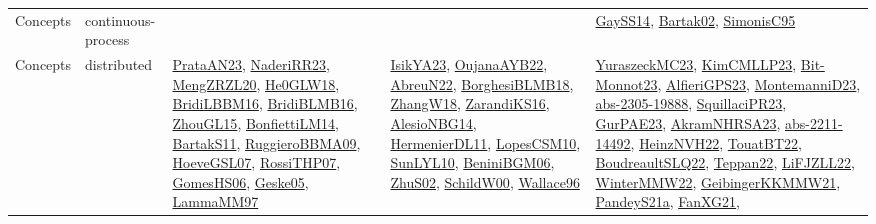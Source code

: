 {\begin{longtable}{lp{3cm}>{\raggedright}p{6cm}>{\raggedright}p{6cm}p{8cm}}
Concepts & continuous-process &  &  & \href{papers/GaySS14.pdf}{GaySS14}\cite{GaySS14}, \href{papers/Bartak02.pdf}{Bartak02}\cite{Bartak02}, \href{papers/SimonisC95.pdf}{SimonisC95}\cite{SimonisC95}\\
Concepts & distributed & \href{articles/PrataAN23.pdf}{PrataAN23}\cite{PrataAN23}, \href{articles/NaderiRR23.pdf}{NaderiRR23}\cite{NaderiRR23}, \href{articles/MengZRZL20.pdf}{MengZRZL20}\cite{MengZRZL20}, \href{papers/He0GLW18.pdf}{He0GLW18}\cite{He0GLW18}, \href{papers/BridiLBBM16.pdf}{BridiLBBM16}\cite{BridiLBBM16}, \href{articles/BridiBLMB16.pdf}{BridiBLMB16}\cite{BridiBLMB16}, \href{papers/ZhouGL15.pdf}{ZhouGL15}\cite{ZhouGL15}, \href{papers/BonfiettiLM14.pdf}{BonfiettiLM14}\cite{BonfiettiLM14}, \href{articles/BartakS11.pdf}{BartakS11}\cite{BartakS11}, \href{articles/RuggieroBBMA09.pdf}{RuggieroBBMA09}\cite{RuggieroBBMA09}, \href{papers/HoeveGSL07.pdf}{HoeveGSL07}\cite{HoeveGSL07}, \href{papers/RossiTHP07.pdf}{RossiTHP07}\cite{RossiTHP07}, \href{papers/GomesHS06.pdf}{GomesHS06}\cite{GomesHS06}, \href{papers/Geske05.pdf}{Geske05}\cite{Geske05}, \href{articles/LammaMM97.pdf}{LammaMM97}\cite{LammaMM97} & \href{articles/IsikYA23.pdf}{IsikYA23}\cite{IsikYA23}, \href{papers/OujanaAYB22.pdf}{OujanaAYB22}\cite{OujanaAYB22}, \href{articles/AbreuN22.pdf}{AbreuN22}\cite{AbreuN22}, \href{articles/BorghesiBLMB18.pdf}{BorghesiBLMB18}\cite{BorghesiBLMB18}, \href{articles/ZhangW18.pdf}{ZhangW18}\cite{ZhangW18}, \href{articles/ZarandiKS16.pdf}{ZarandiKS16}\cite{ZarandiKS16}, \href{papers/AlesioNBG14.pdf}{AlesioNBG14}\cite{AlesioNBG14}, \href{papers/HermenierDL11.pdf}{HermenierDL11}\cite{HermenierDL11}, \href{articles/LopesCSM10.pdf}{LopesCSM10}\cite{LopesCSM10}, \href{papers/SunLYL10.pdf}{SunLYL10}\cite{SunLYL10}, \href{papers/BeniniBGM06.pdf}{BeniniBGM06}\cite{BeniniBGM06}, \href{papers/ZhuS02.pdf}{ZhuS02}\cite{ZhuS02}, \href{articles/SchildW00.pdf}{SchildW00}\cite{SchildW00}, \href{articles/Wallace96.pdf}{Wallace96}\cite{Wallace96} & \href{papers/YuraszeckMC23.pdf}{YuraszeckMC23}\cite{YuraszeckMC23}, \href{papers/KimCMLLP23.pdf}{KimCMLLP23}\cite{KimCMLLP23}, \href{papers/Bit-Monnot23.pdf}{Bit-Monnot23}\cite{Bit-Monnot23}, \href{articles/AlfieriGPS23.pdf}{AlfieriGPS23}\cite{AlfieriGPS23}, \href{articles/MontemanniD23.pdf}{MontemanniD23}\cite{MontemanniD23}, \href{articles/abs-2305-19888.pdf}{abs-2305-19888}\cite{abs-2305-19888}, \href{papers/SquillaciPR23.pdf}{SquillaciPR23}\cite{SquillaciPR23}, \href{articles/GurPAE23.pdf}{GurPAE23}\cite{GurPAE23}, \href{articles/AkramNHRSA23.pdf}{AkramNHRSA23}\cite{AkramNHRSA23}, \href{articles/abs-2211-14492.pdf}{abs-2211-14492}\cite{abs-2211-14492}, \href{articles/HeinzNVH22.pdf}{HeinzNVH22}\cite{HeinzNVH22}, \href{papers/TouatBT22.pdf}{TouatBT22}\cite{TouatBT22}, \href{papers/BoudreaultSLQ22.pdf}{BoudreaultSLQ22}\cite{BoudreaultSLQ22}, \href{papers/Teppan22.pdf}{Teppan22}\cite{Teppan22}, \href{papers/LiFJZLL22.pdf}{LiFJZLL22}\cite{LiFJZLL22}, \href{papers/WinterMMW22.pdf}{WinterMMW22}\cite{WinterMMW22}, \href{papers/GeibingerKKMMW21.pdf}{GeibingerKKMMW21}\cite{GeibingerKKMMW21}, \href{articles/PandeyS21a.pdf}{PandeyS21a}\cite{PandeyS21a}, \href{articles/FanXG21.pdf}{FanXG21}\cite{FanXG21}, 
\end{longtable}}
